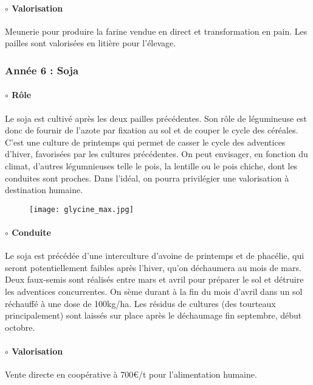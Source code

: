 \documentclass{book}
\begin{document}
\paragraph{$\circ$ Valorisation} Meunerie pour produire la farine vendue en direct et transformation en pain. Les pailles sont valorisées en litière pour l'élevage. 

\subsubsection{Année 6 : Soja}

\paragraph{$\circ$ Rôle} Le soja est cultivé après les deux pailles précédentes. Son rôle de légumineuse est donc de fournir de l'azote par fixation au sol et de couper le cycle des céréales. C'est une culture de printemps qui permet de casser le cycle des adventices d'hiver, favorisées par les cultures précédentes. On peut envisager, en fonction du climat, d'autres légumnieuses telle le pois, la lentille ou le pois chiche, dont les conduites sont proches. Dans l'idéal, on pourra privilégier une valorisation à destination humaine.

\begin{figure}[h!]
\begin{center}
	\texttt{[image: glycine\_max.jpg]}
\end{center}
\end{figure}

\paragraph{$\circ$ Conduite} Le soja est précédée d'une interculture d'avoine de printemps et de phacélie, qui seront potentiellement faibles après l'hiver, qu'on déchaumera au mois de mars. Deux faux-semis sont réalisés entre mars et avril pour préparer le sol et détruire les adventices concurrentes. On sème durant à la fin du mois d'avril dans un sol réchauffé à une dose de 100kg/ha. Les résidus de cultures (des tourteaux principalement) sont laissés sur place après le déchaumage fin septembre, début octobre.

\paragraph{$\circ$ Valorisation} Vente directe en coopérative à 700\euro{}/t pour l'alimentation humaine.
\end{document}
